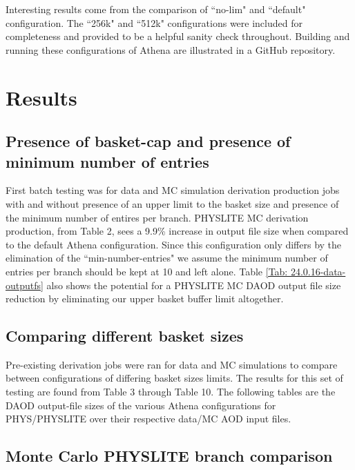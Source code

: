 Interesting results come from the comparison of ``no-lim" and ``default" configuration. The ``256k" and ``512k" configurations were included for completeness and provided to be a helpful sanity check throughout. 
Building and running these configurations of Athena are illustrated in a GitHub repository. \cite{Kraus}

\section{Results}
\subsection{Presence of basket-cap and presence of minimum number of entries}

First batch testing was for data and MC simulation derivation production jobs with and without presence of an upper limit to the basket size and presence of the minimum number of entires per branch. 
PHYSLITE MC derivation production, from Table 2, sees a 9.9\% increase in output file size when compared to the default Athena configuration. 
Since this configuration only differs by the elimination of the ``min-number-entries" we assume the minimum number of entries per branch should be kept at 10 and left alone. 
Table \ref{Tab: 24.0.16-data-outputfs} also shows the potential for a PHYSLITE MC DAOD output file size reduction by eliminating our upper basket buffer limit altogether.  



\subsection{Comparing different basket sizes}

Pre-existing derivation jobs were ran for data and MC simulations to compare between configurations of differing basket sizes limits. 
The results for this set of testing are found from Table 3 through Table 10. 
The following tables are the DAOD output-file sizes of the various Athena configurations for PHYS/PHYSLITE over their respective data/MC AOD input files. 



\subsection{Monte Carlo PHYSLITE branch comparison}

